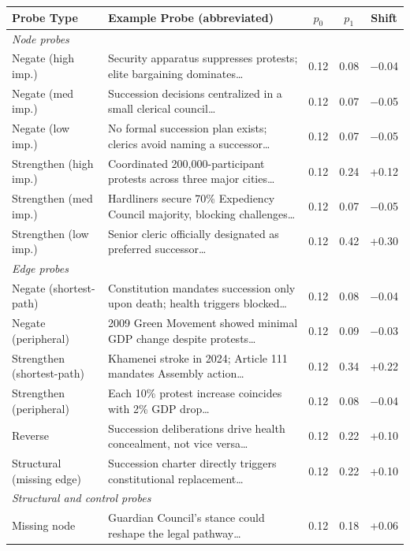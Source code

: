 \documentclass[11pt]{article}
\begin{document}
\begin{table}[t]
\centering
\small
\begin{tabular}{lp{8.5cm}ccc}
\toprule
\textbf{Probe Type} & \textbf{Example Probe (abbreviated)} & \textbf{$p_0$} & \textbf{$p_1$} & \textbf{Shift} \\
\midrule
\multicolumn{5}{l}{\textit{Node probes}} \\
Negate (high imp.) & Security apparatus suppresses protests; elite bargaining dominates\ldots & 0.12 & 0.08 & $-$0.04 \\
Negate (med imp.) & Succession decisions centralized in a small clerical council\ldots & 0.12 & 0.07 & $-$0.05 \\
Negate (low imp.) & No formal succession plan exists; clerics avoid naming a successor\ldots & 0.12 & 0.07 & $-$0.05 \\
Strengthen (high imp.) & Coordinated 200,000-participant protests across three major cities\ldots & 0.12 & 0.24 & +0.12 \\
Strengthen (med imp.) & Hardliners secure 70\% Expediency Council majority, blocking challenges\ldots & 0.12 & 0.07 & $-$0.05 \\
Strengthen (low imp.) & Senior cleric officially designated as preferred successor\ldots & 0.12 & 0.42 & +0.30 \\
\midrule
\multicolumn{5}{l}{\textit{Edge probes}} \\
Negate (shortest-path) & Constitution mandates succession only upon death; health triggers blocked\ldots & 0.12 & 0.08 & $-$0.04 \\
Negate (peripheral) & 2009 Green Movement showed minimal GDP change despite protests\ldots & 0.12 & 0.09 & $-$0.03 \\
Strengthen (shortest-path) & Khamenei stroke in 2024; Article 111 mandates Assembly action\ldots & 0.12 & 0.34 & +0.22 \\
Strengthen (peripheral) & Each 10\% protest increase coincides with 2\% GDP drop\ldots & 0.12 & 0.08 & $-$0.04 \\
Reverse & Succession deliberations drive health concealment, not vice versa\ldots & 0.12 & 0.22 & +0.10 \\
Structural (missing edge) & Succession charter directly triggers constitutional replacement\ldots & 0.12 & 0.22 & +0.10 \\
\midrule
\multicolumn{5}{l}{\textit{Structural and control probes}} \\
Missing node & Guardian Council's stance could reshape the legal pathway\ldots & 0.12 & 0.18 & +0.06 \\

\end{tabular}
\end{table}
\end{document}
